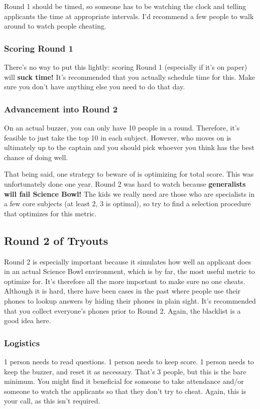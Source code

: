 \documentclass[11pt, letterpaper]{article}
\begin{document}
Round 1 should be timed, so someone has to be watching the clock and telling applicants the time at appropriate intervals.
I'd recommend a few people to walk around to watch people cheating.

\subsubsection{Scoring Round 1}

There's no way to put this lightly: scoring Round 1 (especially if it's on paper) will \textbf{suck time!}
It's recommended that you actually schedule time for this.
Make sure you don't have anything else you need to do that day.

\subsubsection{Advancement into Round 2}
On an actual buzzer, you can only have 10 people in a round.
Therefore, it's feasible to just take the top 10 in each subject.
However, who moves on is ultimately up to the captain and you should pick whoever you think has the best chance of doing well.

That being said, one strategy to beware of is optimizing for total score.
This was unfortunately done one year.
Round 2 was hard to watch because \textbf{generalists will fail Science Bowl!}
The kids we really need are those who are specialists in a few core subjects (at least 2, 3 is optimal), so try to find a selection procedure that optimizes for this metric.

\subsection{Round 2 of Tryouts}

Round 2 is especially important because it simulates how well an applicant does in an actual Science Bowl environment, which is by far, the most useful metric to optimize for.
It's therefore all the more important to make sure no one cheats.
Although it is hard, there have been cases in the past where people use their phones to lookup answers by hiding their phones in plain sight.
It's recommended that you collect everyone's phones prior to Round 2.
Again, the blacklist is a good idea here.

\subsubsection{Logistics}
1 person needs to read questions.
1 person needs to keep score.
1 person needs to keep the buzzer, and reset it as necessary.
That's 3 people, but this is the bare minimum.
You might find it beneficial for someone to take attendance and/or someone to watch the applicants so that they don't try to cheat.
Again, this is your call, as this isn't required.
\end{document}
